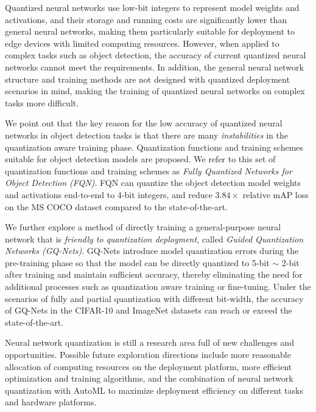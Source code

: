 \documentclass[
  fontset = mac,
]{shtthesis}
\begin{document}
\begin{abstract*}
Quantized neural networks use low-bit integers to represent model weights and activations, and their storage and running costs are significantly lower than general neural networks, making them particularly suitable for deployment to edge devices with limited computing resources. However, when applied to complex tasks such as object detection, the accuracy of current quantized neural networks cannot meet the requirements. In addition, the general neural network structure and training methods are not designed with quantized deployment scenarios in mind, making the training of quantized neural networks on complex tasks more difficult.

We point out that the key reason for the low accuracy of quantized neural networks in object detection tasks is that there are many \emph{instabilities} in the quantization aware training phase. Quantization functions and training schemes suitable for object detection models are proposed. We refer to this set of quantization functions and training schemes as \emph{Fully Quantized Networks for Object Detection (FQN)}. FQN can quantize the object detection model weights and activations end-to-end to 4-bit integers, and reduce $3.84\times$ relative mAP loss on the MS COCO dataset compared to the state-of-the-art.

We further explore a method of directly training a general-purpose neural network that is \emph{friendly to quantization deployment}, called \emph{Guided Quantization Networks (GQ-Nets)}. GQ-Nets introduce model quantization errors during the pre-training phase so that the model can be directly quantized to 5-bit $\sim$ 2-bit after training and maintain sufficient accuracy, thereby eliminating the need for additional processes such as quantization aware training or fine-tuning. Under the scenarios of fully and partial quantization with different bit-width, the accuracy of GQ-Nets in the CIFAR-10 and ImageNet datasets can reach or exceed the state-of-the-art.

Neural network quantization is still a research area full of new challenges and opportunities. Possible future exploration directions include more reasonable allocation of computing resources on the deployment platform, more efficient optimization and training algorithms, and the combination of neural network quantization with AutoML to maximize deployment efficiency on different tasks and hardware platforms.
\end{abstract*}
\end{document}
